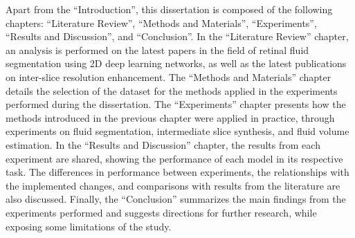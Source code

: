 Apart from the ``Introduction'', this dissertation is composed of the following chapters: ``Literature Review'', ``Methods and Materials'', ``Experiments'', ``Results and Discussion'', and ``Conclusion''. In the ``Literature Review'' chapter, an analysis is performed on the latest papers in the field of retinal fluid segmentation using 2D deep learning networks, as well as the latest publications on inter-slice resolution enhancement. The ``Methods and Materials'' chapter details the selection of the dataset for the methods applied in the experiments performed during the dissertation. The ``Experiments'' chapter presents how the methods introduced in the previous chapter were applied in practice, through experiments on fluid segmentation, intermediate slice synthesis, and fluid volume estimation. In the ``Results and Discussion'' chapter, the results from each experiment are shared, showing the performance of each model in its respective task. The differences in performance between experiments, the relationships with the implemented changes, and comparisons with results from the literature are also discussed. Finally, the ``Conclusion'' summarizes the main findings from the experiments performed and suggests directions for further research, while exposing some limitations of the study.
